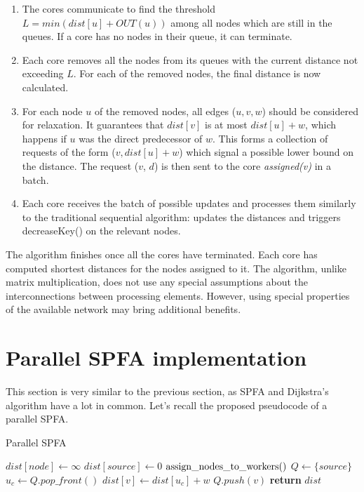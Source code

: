 \documentclass[12pt,a4paper,twoside,openright]{report}
\begin{document}
\begin{enumerate}
    \item The cores communicate to find the threshold $L = min(dist[u] + OUT(u))$ among all nodes which are still in the queues. If a core has no nodes in their queue, it can terminate.
    \item Each core removes all the nodes from its queues with the current distance not exceeding $L$. For each of the removed nodes, the final distance is now calculated.
    \item For each node $u$ of the removed nodes, all edges ($u, v, w$) should be considered for relaxation. It guarantees that $dist[v]$ is at most $dist[u] + w$, which happens if $u$ was the direct predecessor of $w$. This forms a collection of requests of the form ($v, dist[u]+w$) which signal a possible lower bound on the distance. The request ($v$, $d$) is then sent to the core \textit{assigned(v)} in a batch.
    \item Each core receives the batch of possible updates and processes them similarly to the traditional sequential algorithm: updates the distances and triggers decreaseKey() on the relevant nodes.
\end{enumerate}

The algorithm finishes once all the cores have terminated. Each core has computed shortest distances for the nodes assigned to it. The algorithm, unlike matrix multiplication, does not use any special assumptions about the interconnections between processing elements. However, using special properties of the available network may bring additional benefits.

\section{Parallel SPFA implementation}
This section is very similar to the previous section, as SPFA and Dijkstra's algorithm have a lot in common. Let's recall the proposed pseudocode of a parallel SPFA.

\begin{algorithm}
\caption{Parallel SPFA}\label{pspfa2}
\begin{algorithmic}[1]
    \State $dist[node] \gets \infty$
\EndFor
\State $dist[source] \gets 0$
\State $\rm{assign\_nodes\_to\_workers()}$
\State $Q \gets \{source\}$ 
        \State $u_c \gets Q.pop\_front()$
            \State $dist[v] \gets dist[u_c] + w$
                \State $Q.push(v)$
                \EndIf
        \EndIf
        \EndFor
      \EndFor
    \EndWhile
\State \textbf{return} $dist$
\EndProcedure
\end{algorithmic}
\end{algorithm}
\end{document}
